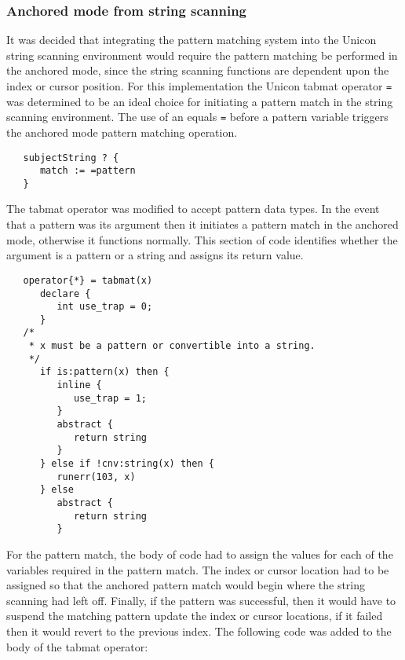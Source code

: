 \documentclass{article}
\begin{document}
\subsubsection{Anchored mode from string scanning}
It was decided that integrating the pattern matching system into the Unicon string scanning environment would require the pattern matching be performed in the anchored mode, since the string scanning functions are dependent upon the index or cursor position.  For this implementation the Unicon tabmat operator \texttt{=} was determined to be an ideal choice for initiating a pattern match in the string scanning environment.  The use of an equals \texttt{=} before a pattern variable triggers the anchored mode pattern matching operation.
 
\begin{verbatim}
   subjectString ? {
      match := =pattern
   }
\end{verbatim}

The tabmat operator was modified to accept pattern data types.  In the event that a pattern was its argument then it initiates a pattern match in the anchored mode, otherwise it functions normally.  This section of code identifies whether the argument is a pattern or a string and assigns its return value.

\begin{verbatim}
   operator{*} = tabmat(x)
      declare {
         int use_trap = 0;
      }
   /*
    * x must be a pattern or convertible into a string.
    */
      if is:pattern(x) then {
         inline {
            use_trap = 1;
         }
         abstract {
            return string
         }
      } else if !cnv:string(x) then {
         runerr(103, x)
      } else 
         abstract {
            return string
         }
\end{verbatim}

For the pattern match, the body of code had to assign the values for each of the variables required in the pattern match.  The index or cursor location had to be assigned so that the anchored pattern match would begin where the string scanning had left off.  Finally, if the pattern was successful, then it would have to suspend the matching pattern update the index or cursor locations, if it failed then it would revert to the previous index.  The following code was added to the body of the tabmat operator:
\end{document}
